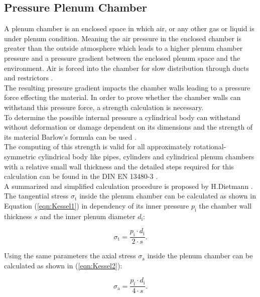 \subsection{Pressure Plenum Chamber}
\label{sec:plenumchamber}
A plenum chamber is an enclosed space in which air, or any other gas or liquid is under plenum condition. Meaning the air pressure in the enclosed chamber is greater than the outside atmosphere which leads to a higher plenum chamber pressure and a pressure gradient between the enclosed plenum space and the environment. Air is forced into the chamber for slow distribution through ducts and restrictors \cite{.2003}.\\
The resulting pressure gradient impacts the chamber walls leading to a pressure force effecting the material. In order to prove whether the chamber walls can withstand this pressure force, a strength calculation is necessary.\\
To determine the possible internal pressure a cylindrical body can withstand without deformation or damage dependent on its dimensions and the strength of its material Barlow's formula can be used \cite{.2003}.\\
The computing of this strength is valid for all approximately rotational-symmetric cylindrical body like pipes, cylinders and cylindrical plenum chambers with a relative small wall thickness and the detailed steps required for this calculation can be found in the DIN EN 13480-3 \cite{.NormDINEN13480}.\\

A summarized and simplified calculation procedure is proposed by H.Dietmann \cite{Dietmann.1992}.\\
The tangential stress $\sigma_\text{t}$ inside the plenum chamber can be calculated as shown in Equation (\ref{eqn:Kessel1}) in dependency of its inner pressure $p_\text{i}$ the chamber wall thickness $s$ and the inner plenum diameter $d_\text{i}$:

\begin{equation}
\sigma_\text{t} = \frac{p_\text{i} \cdot d_\text{i}}{2 \cdot s} .
\label{eqn:Kessel1}
\end{equation}
 
 
Using the same parameters the axial stress $\sigma_\text{a}$ inside the plenum chamber can be calculated as shown in (\ref{eqn:Kessel2}):

\begin{equation}
\sigma_\text{a} = \frac{p_\text{i} \cdot d_\text{i}}{4 \cdot s} .
\label{eqn:Kessel2}
\end{equation}

